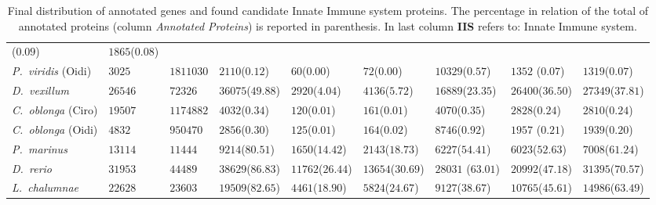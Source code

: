 \documentclass[11pt]{article}
\begin{document}
\begin{table}
\begin{tabular}{p{3.2cm}p{2cm}p{2cm}p{2cm}p{2cm}p{2cm}p{2cm}p{2.7cm}p{2.6cm}}
($0.09$)&$1865$($0.08$)\\
\textsl{P.\ viridis} (Oidi)&     
$3025$&$1811030$&$2110$($0.12$)&$60$($0.00$)&$72$($0.00$)&$10329$($0.57$)&$1352$
($0.07$)&$1319$($0.07$)\\
\textsl{D.\ vexillum}&
$26546$&$72326$&$36075$($49.88$)&$2920$($4.04$)&$4136$($5.72$)&$16889$($23.35$)&
$26400$($36.50$)&$27349$($37.81$)\\
\textsl{C.\ oblonga} (Ciro)&     
$19507$&$1174882$&$4032$($0.34$)&$120$($0.01$)&$161$($0.01$)&$4070$($0.35$)&$282
8$($0.24$)&$2810$($0.24$)\\
\textsl{C.\ oblonga} (Oidi)&     
$4832$&$950470$&$2856$($0.30$)&$125$($0.01$)&$164$($0.02$)&$8746$($0.92$)&$1957$
($0.21$)&$1939$($0.20$)\\
\midrule
\textsl{P.\ marinus}
&$13114$&$11444$&$9214$($80.51$)&$1650$($14.42$)&$2143$($18.73$)&$6227$($5
4.41$)&$6023$($52.63$)&$7008$($61.24$)\\
\textsl{D.\ rerio}
&$31953$&$44489$&$38629$($86.83$)&$11762$($26.44$)&$13654$($30.69$)&$28031$
($63.01$)&$20992$($47.18$)&$31395$($70.57$)\\
\textsl{L.\ chalumnae}
&$22628$&$23603$&$19509$($82.65$)&$4461$($18.90$)&$5824$($24.67$)&$9127$($3
8.67$)&$10765$($45.61$)&$14986$($63.49$)\\
\bottomrule
\end{tabular}
\caption{Final distribution of annotated genes and found candidate Innate 
Immune system proteins. The percentage in relation of the total of annotated  
proteins (column \textit{Annotated Proteins}) is reported in parenthesis. In 
last column \textbf{IIS} refers to: Innate Immune system.}
\label{table:distribution_prot}
\end{table}
\end{document}

